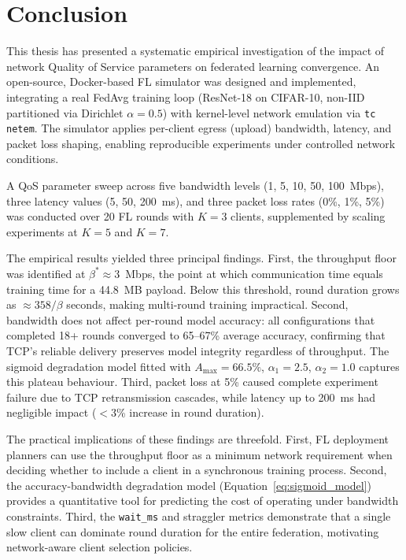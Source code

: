 \documentclass[12pt,a4paper]{report}
\begin{document}
\chapter{Conclusion}
\label{ch:conclusion}

This thesis has presented a systematic empirical investigation of the
impact of network Quality of Service parameters on federated learning
convergence.  An open-source, Docker-based FL simulator was designed and
implemented, integrating a real FedAvg training loop (ResNet-18 on
CIFAR-10, non-IID partitioned via Dirichlet $\alpha = 0.5$) with
kernel-level network emulation via \texttt{tc netem}.  The simulator
applies per-client egress (upload) bandwidth, latency, and packet loss
shaping, enabling reproducible experiments under controlled network
conditions.

A QoS parameter sweep across five bandwidth levels (1, 5, 10, 50,
100~Mbps), three latency values (5, 50, 200~ms), and three packet loss
rates (0\%, 1\%, 5\%) was conducted over 20 FL rounds with $K = 3$
clients, supplemented by scaling experiments at $K = 5$ and $K = 7$.

The empirical results yielded three principal findings.  First, the
throughput floor was identified at $\beta^* \approx 3$~Mbps, the point
at which communication time equals training time for a 44.8~MB payload.
Below this threshold, round duration grows as $\approx 358/\beta$
seconds, making multi-round training impractical.  Second, bandwidth
does not affect per-round model accuracy: all configurations that
completed 18+ rounds converged to 65--67\% average accuracy, confirming
that TCP's reliable delivery preserves model integrity regardless of
throughput.  The sigmoid degradation model fitted with
$A_{\max} = 66.5\%$, $\alpha_1 = 2.5$, $\alpha_2 = 1.0$ captures this
plateau behaviour.  Third, packet loss at 5\% caused complete experiment
failure due to TCP retransmission cascades, while latency up to 200~ms
had negligible impact ($<$3\% increase in round duration).

The practical implications of these findings are threefold.  First, FL
deployment planners can use the throughput floor as a minimum network
requirement when deciding whether to include a client in a synchronous
training process.  Second, the accuracy-bandwidth degradation model
(Equation~\ref{eq:sigmoid_model}) provides a quantitative tool for
predicting the cost of operating under bandwidth constraints.  Third, the
\texttt{wait\_ms} and straggler metrics demonstrate that a single
slow client can dominate round duration for the entire federation,
motivating network-aware client selection policies.
\end{document}
